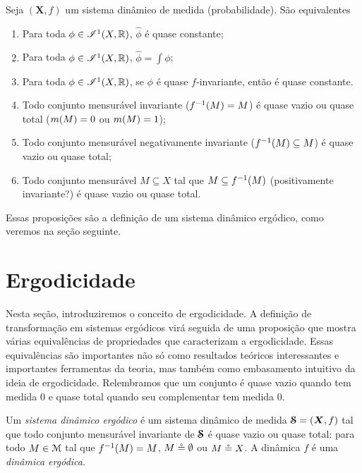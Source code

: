 \begin{proposition}
Seja $(\bm X,f)$ um sistema dinâmico de medida (probabilidade). São equivalentes
	\begin{enumerate}
	\item Para toda $\phi \in \mathscr{I}^1(X,\mathbb{R})$, $\widehat{\phi}$ é quase constante;

	\item Para toda $\phi \in \mathscr{I}^1(X,\mathbb{R})$, $\widehat{\phi} = \int \phi$;

	\item Para toda $\phi \in \mathscr{I}^1(X,\mathbb{R})$, se $\phi$ é quase $f$-invariante, então é quase constante.

	\item Todo conjunto mensurável invariante ($f^{-1}(M) = M$) é quase vazio ou quase total ($m(M) = 0$ ou $m(M) = 1$);

	\item Todo conjunto mensurável negativamente invariante ($f^{-1}(M) \subseteq M$) é quase vazio ou quase total;

	\item Todo conjunto mensurável $M \subseteq X$ tal que $M \subseteq f^{-1}(M)$ (positivamente invariante?) é quase vazio ou quase total.
	\end{enumerate}
\end{proposition}

Essas proposições são a definição de um sistema dinâmico ergódico, como veremos na seção seguinte.

\section{Ergodicidade}

Nesta seção, introduziremos o conceito de ergodicidade. A definição de transformação em sistemas ergódicos virá seguida de uma proposição que mostra várias equivalências de propriedades que caracterizam a ergodicidade. Essas equivalências são importantes não só como resultados teóricos interessantes e importantes ferramentas da teoria, mas também como embasamento intuitivo da ideia de ergodicidade. Relembramos que um conjunto é quase vazio quando tem medida $0$ e quase total quando seu complementar tem medida $0$.

\begin{definition}
Um \emph{sistema dinâmico ergódico} é um sistema dinâmico de medida $\bm{\mathcal{S}}=(\bm X,f)$ tal que todo conjunto mensurável invariante de $\bm{\mathcal{S}}$ é quase vazio ou quase total: para todo $M \in \mathcal{M}$ tal que $f^{-1}(M) = M$, $M \circeq \emptyset$ ou $M \circeq X$. A dinâmica $f$ é uma \emph{dinâmica ergódica}.
\end{definition}

